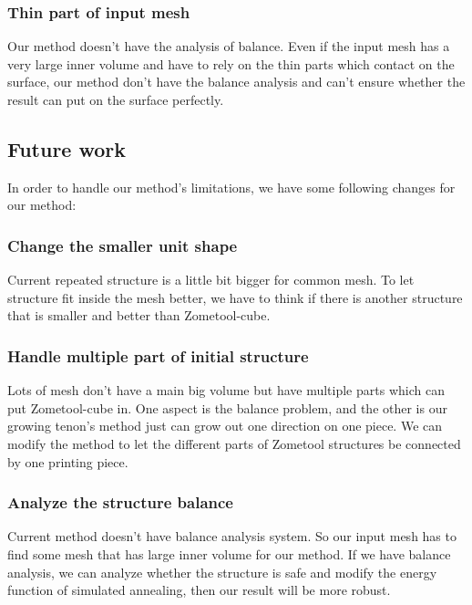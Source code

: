 \subsubsection{Thin part of input mesh} 
Our method doesn't have the analysis of balance. 
Even if the input mesh has a very large inner volume and have to rely on the thin parts which contact on the surface, our method don't have the balance analysis and can't ensure whether the result can put on the surface perfectly. 


\subsection{Future work}
In order to handle our method's limitations, we have some following changes for our method:

\subsubsection{Change the smaller unit shape} 
Current repeated structure is a little bit bigger for common mesh. To let structure fit inside the mesh better, we have to think if there is another structure that is smaller and better than Zometool-cube.

\subsubsection{Handle multiple part of initial structure} 
Lots of mesh don't have a main big volume but have multiple parts which can put Zometool-cube in. One aspect is the balance problem, and the other is our growing tenon's method just can grow out one direction on one piece. We can modify the method to let the different parts of Zometool structures be connected by one printing piece. 

\subsubsection{Analyze the structure balance} 
Current method doesn't have balance analysis system. So our input mesh has to find some mesh that has large inner volume for our method. If we have balance analysis, we can analyze whether the structure is safe and modify the energy function of simulated annealing, then our result will be more robust.

